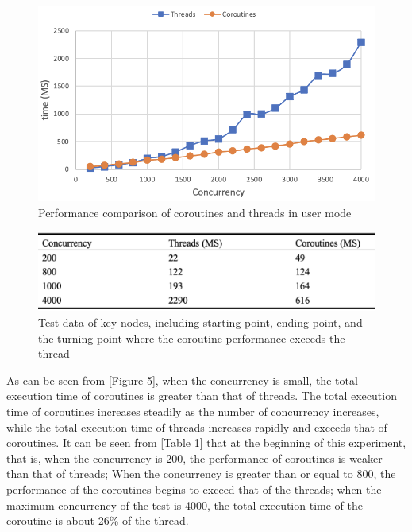 \documentclass[10pt]{article}
\begin{document}
\begin{figure}[ht]
\begin{center}
\centerline{\includegraphics[width=\columnwidth]{user.png}}
\caption{Performance comparison of coroutines and threads in user mode}
\label{user}
\end{center}
\end{figure}

\begin{figure}[ht]
\begin{center}
\centerline{\includegraphics[width=\columnwidth]{user_table.png}}
\caption{Test data of key nodes, including starting point, ending point, and the turning point where the coroutine performance exceeds the thread}
\label{user_table}
\end{center}
\end{figure}

As can be seen from [Figure 5], when the concurrency is small, the total execution time of coroutines is greater than that of threads. The total execution time of coroutines increases steadily as the number of concurrency increases, while the total execution time of threads increases rapidly and exceeds that of coroutines. It can be seen from [Table 1] that at the beginning of this experiment, that is, when the concurrency is 200, the performance of coroutines is weaker than that of threads; When the concurrency is greater than or equal to 800, the performance of the coroutines begins to exceed that of the threads; when the maximum concurrency of the test is 4000, the total execution time of the coroutine is about 26\% of the thread.
\end{document}
